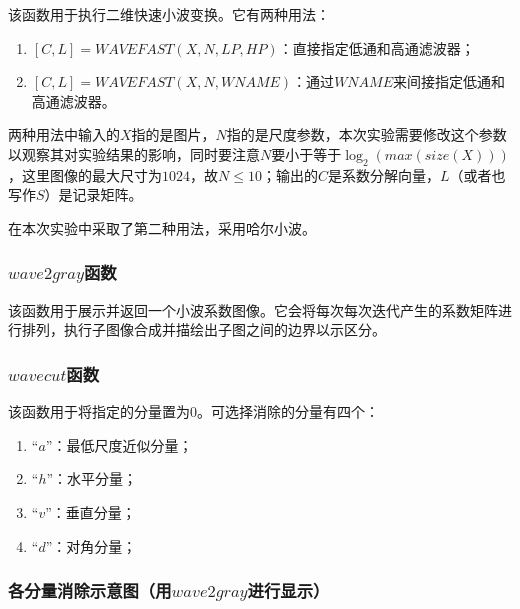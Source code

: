 \documentclass[UTF8]{ctexart}
\begin{document}
                \indent 该函数用于执行二维快速小波变换。它有两种用法：
    			
                \begin{enumerate}[leftmargin=50pt]
    				\item $[C, L] = WAVEFAST(X, N, LP, HP)$：直接指定低通和高通滤波器；
                    \item $[C, L] = WAVEFAST(X, N, WNAME)$：通过$WNAME$来间接指定低通和高通滤波器。
    			\end{enumerate}                
                
                \indent 两种用法中输入的$X$指的是图片，$N$指的是尺度参数，本次实验需要修改这个参数以观察其对实验结果的影响，同时要注意$N$要小于等于$\log_2\left(max\left( size\left( X \right) \right)  \right)$，这里图像的最大尺寸为$1024$，故$N \le 10$；输出的$C$是系数分解向量，$L$（或者也写作$S$）是记录矩阵。
                
                \indent 在本次实验中采取了第二种用法，采用哈尔小波。
         
            \subsubsection{$wave2gray$函数}
                
                \indent 该函数用于展示并返回一个小波系数图像。它会将每次每次迭代产生的系数矩阵进行排列，执行子图像合成并描绘出子图之间的边界以示区分\cite{digit_image_Gonzalez_matlab}。
         
            \subsubsection{$wavecut$函数}
            
                \indent 该函数用于将指定的分量置为$0$。可选择消除的分量有四个：

                \begin{enumerate}[leftmargin=50pt]
    				\item “$a$”：最低尺度近似分量；
                    \item “$h$”：水平分量；
                    \item “$v$”：垂直分量；
                    \item “$d$”：对角分量；
    			\end{enumerate}           
                
                \subsubsection*{各分量消除示意图（用$wave2gray$进行显示）}
 
\end{document}
